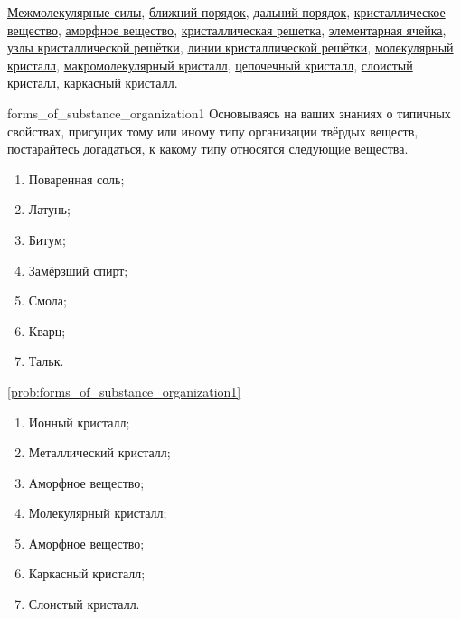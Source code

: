 \begin{termlist}
    \hyperref[term:intermolecular_forces]{Межмолекулярные силы},
    \hyperref[term:short-range_order]{ближний порядок},
    \hyperref[term:long-range_order]{дальний порядок},
    \hyperref[term:crystalline_substance]{кристаллическое вещество},
    \hyperref[term:amorphous_substance]{аморфное вещество},
    \hyperref[term:crystal_lattice]{кристаллическая решетка},
    \hyperref[term:unit_cell]{элементарная ячейка},
    \hyperref[term:lattice_points]{узлы кристаллической решётки},
    \hyperref[term:lattice_vectors]{линии кристаллической решётки},
    \hyperref[term:molecular_crystal]{молекулярный кристалл},
    \hyperref[term:macromolecular_crystal]{макромолекулярный кристалл},
    \hyperref[term:chain-structured_crystal]{цепочечный кристалл},
    \hyperref[term:layered_crystal]{слоистый кристалл},
    \hyperref[term:framework_crystal]{каркасный кристалл}.
\end{termlist}

\begin{problem}{}{forms_of_substance_organization1}
    Основываясь на ваших знаниях о типичных свойствах, присущих тому или иному типу организации твёрдых веществ, постарайтесь догадаться, к какому типу относятся следующие вещества.
    \begin{enumerate}[label=\arabic*)]
        \item Поваренная соль;
        \item Латунь;
        \item Битум;
        \item Замёрзший спирт;
        \item Смола;
        \item Кварц;
        \item Тальк.
    \end{enumerate}
    \begin{sol}{\ref{prob:forms_of_substance_organization1}}
        \begin{enumerate}[label=\arabic*)]
            \item Ионный кристалл;
            \item Металлический кристалл;
            \item Аморфное вещество;
            \item Молекулярный кристалл;
            \item Аморфное вещество;
            \item Каркасный кристалл;
            \item Слоистый кристалл.
    \end{enumerate}
    \end{sol}
\end{problem}

